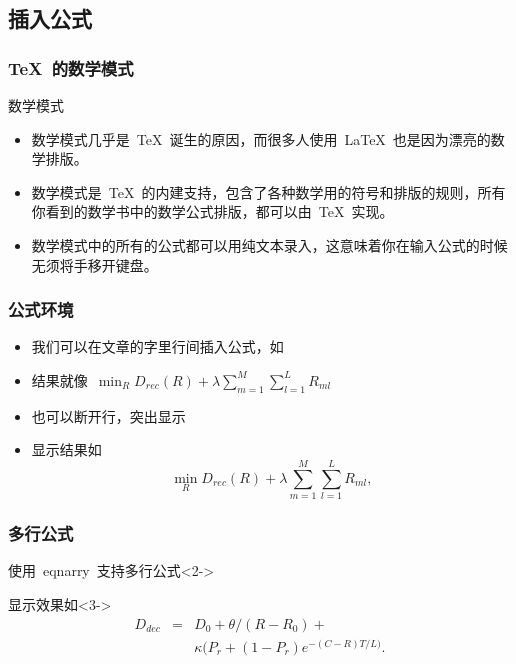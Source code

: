 \subsection{插入公式}
\begin{frame}
	\frametitle{\TeX~的数学模式}
	\begin{block}{数学模式}
	\begin{itemize}[<+->]
		\item 数学模式几乎是~\TeX~诞生的原因，而很多人使用~\LaTeX~也是因为漂亮的数学排版。
		\item 数学模式是~\TeX~的内建支持，包含了各种数学用的符号和排版的规则，所有你看到的数学书中的数学公式排版，都可以由~\TeX~实现。
		\item 数学模式中的所有的公式都可以用纯文本录入，这意味着你在输入公式的时候无须将手移开键盘。
	\end{itemize}
	\end{block}
\end{frame}

\begin{frame}
	\frametitle{公式环境}
	\begin{itemize}[<+->]
		\item 我们可以在文章的字里行间插入公式，如
			
		\item 结果就像~$\min_R D_{rec}(R)+\lambda\sum_{m=1}^{M}\sum_{l=1}^{L}R_{ml}$
		\item 也可以断开行，突出显示
			
		\item 显示结果如
			\begin{equation}
			\min_R D_{rec}(R)+\lambda\sum_{m=1}^{M}\sum_{l=1}^{L}R_{ml},
			\end{equation}
	\end{itemize}
\end{frame}

\begin{frame}
	\frametitle{多行公式}
	\begin{block}{使用~\alert{eqnarry}~支持多行公式}<2->
		
	\end{block}
	\begin{block}{显示效果如}<3->
			\begin{eqnarray}
				D_{dec} & = & D_0+ \theta/(R-R_0)+ \nonumber \\
				&	& \kappa(P_r+(1-P_r)e^{-(C-R)T/L)}.
				\label{equ:distort}
			\end{eqnarray}
	\end{block}
\end{frame}


